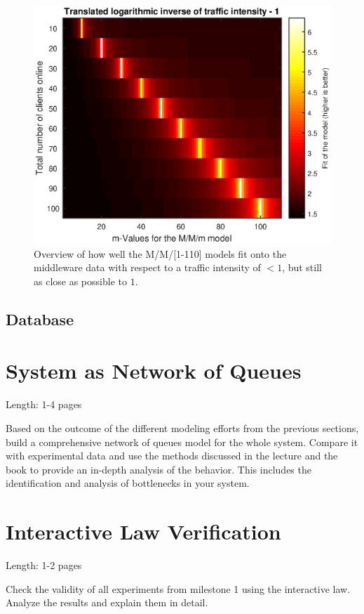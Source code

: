 \documentclass[11pt]{article}
\begin{document}
\begin{figure}[!htb]
\centering
\includegraphics[width=0.7\linewidth]{figures/middleware/load_dependence}
\caption{Overview of how well the M/M/[1-110] models fit onto the middleware data with respect to a traffic intensity of $<1$, but still as close as possible to $1$.}
\label{fig:load_dependence}
\end{figure}




\subsection{Database}

\section{System as Network of Queues}\label{sec:network-of-queues}

Length: 1-4 pages

Based on the outcome of the different modeling efforts from the previous sections, build a comprehensive network of queues model for the whole system. Compare it with experimental data and use the methods discussed in the lecture and the book to provide an in-depth analysis of the behavior. This includes the identification and analysis of bottlenecks in your system.

\section{Interactive Law Verification}\label{sec:interactive-law}

Length: 1-2 pages

Check the validity of all experiments from milestone 1 using the interactive law. Analyze the results and explain them in detail.
\end{document}
